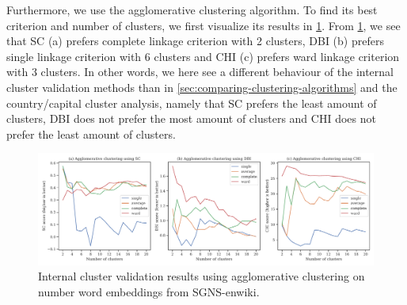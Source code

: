 Furthermore, we use the agglomerative clustering algorithm. To find its best criterion and number of clusters, we first visualize its results in \cref{fig:cluster-analysis-agglomerative-numbers-word-group-internal-cluster-validation}. From \cref{fig:cluster-analysis-agglomerative-numbers-word-group-internal-cluster-validation}, we see that SC (a) prefers complete linkage criterion with 2 clusters, DBI (b) prefers single linkage criterion with 6 clusters and CHI (c) prefers ward linkage criterion with 3 clusters. In other words, we here see a different behaviour of the internal cluster validation methods than in \cref{sec:comparing-clustering-algorithms} and the country/capital cluster analysis, namely that SC prefers the least amount of clusters, DBI does not prefer the most amount of clusters and CHI does not prefer the least amount of clusters.
\begin{figure}[H]
    \centering
    \includegraphics[width=\textwidth]{thesis/figures/cluster-analysis-agglomerative-numbers-word-group-internal-cluster-validation.pdf}
    \caption{Internal cluster validation results using agglomerative clustering on number word embeddings from SGNS-enwiki.}
    \label{fig:cluster-analysis-agglomerative-numbers-word-group-internal-cluster-validation}
\end{figure}

